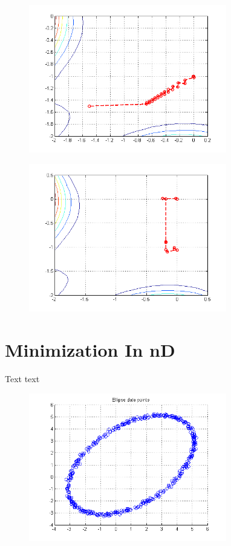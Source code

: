 \documentclass[journal]{IEEEtran}
\begin{document}
\begin{figure}
\centering
\includegraphics[width=3.4in]{figures/2d2-steepestDescent.png}
\caption{}
\label{figSD2}
\end{figure}

\begin{figure}
\centering
\includegraphics[width=3.4in]{figures/2d2-quasiNewton.png}
\caption{}
\label{figQN}
\end{figure}


\section{Minimization In nD}

Text text

\begin{figure}
\centering
\includegraphics[width=3.4in]{figures/nd-groundTruth.png}
\caption{}
\label{figGT}
\end{figure}
\end{document}

